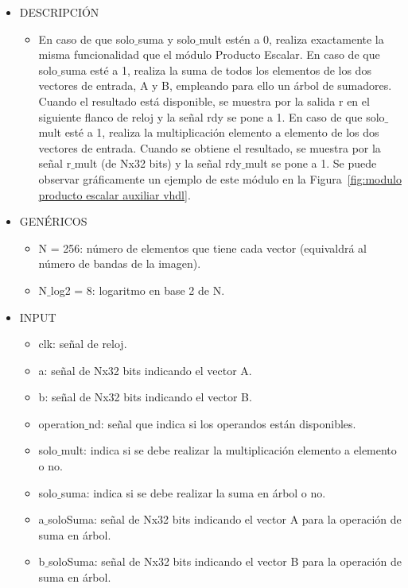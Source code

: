 \begin{itemize}
    \item DESCRIPCIÓN
        \begin{itemize}
            \item En caso de que solo$\_$suma y solo$\_$mult estén a 0, realiza exactamente la misma funcionalidad que el módulo Producto Escalar. En caso de que solo$\_$suma esté a 1, realiza la suma de todos los elementos de los dos vectores de entrada, A y B, empleando para ello un árbol de sumadores. Cuando el resultado está disponible, se muestra por la salida r en el siguiente flanco de reloj y la señal rdy se pone a 1. En caso de que solo$\_$mult esté a 1, realiza la multiplicación elemento a elemento de los dos vectores de entrada. Cuando se obtiene el resultado, se muestra por la señal r$\_$mult (de Nx32 bits) y la señal rdy$\_$mult se pone a 1. Se puede observar gráficamente un ejemplo de este módulo en la Figura~\ref{fig:modulo producto escalar auxiliar vhdl}.
        \end{itemize}
    \item GENÉRICOS
        \begin{itemize}
            \item N = 256: número de elementos que tiene cada vector (equivaldrá al número de bandas de la imagen).
            \item N$\_$log2 = 8: logaritmo en base 2 de N.
        \end{itemize}
    \item INPUT
        \begin{itemize}
            \item clk: señal de reloj.
            \item a: señal de Nx32 bits indicando el vector A.
            \item b: señal de Nx32 bits indicando el vector B.
            \item operation$\_$nd: señal que indica si los operandos están disponibles.
            \item solo$\_$mult: indica si se debe realizar la multiplicación elemento a elemento o no.
            \item solo$\_$suma: indica si se debe realizar la suma en árbol o no.
            \item a$\_$soloSuma: señal de Nx32 bits indicando el vector A para la operación de suma en árbol.
            \item b$\_$soloSuma: señal de Nx32 bits indicando el vector B para la operación de suma en árbol.

\end{itemize}
\end{itemize}
